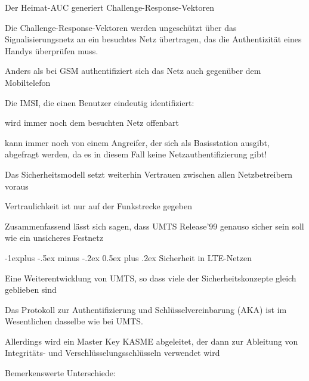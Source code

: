 \documentclass[a4paper]{article}
\makeatletter
\renewcommand{\subsection}{\@startsection{subsection}{2}{0mm}%
 {-1explus -.5ex minus -.2ex}%
 {0.5ex plus .2ex}%
 {\normalfont\normalsize\bfseries}}
\makeatother
\begin{document}
\begin{multicols}{3}
\begin{itemize*}
            \begin{itemize*}
                  \item Der Heimat-AUC generiert Challenge-Response-Vektoren
                  \item Die Challenge-Response-Vektoren werden ungeschützt über das Signalisierungsnetz an ein besuchtes Netz übertragen, das die Authentizität eines Handys überprüfen muss.
                  \item Anders als bei GSM authentifiziert sich das Netz auch gegenüber dem Mobiltelefon
                  \item Die IMSI, die einen Benutzer eindeutig identifiziert:
                  \begin{itemize*} \item wird immer noch dem besuchten Netz offenbart \item kann immer noch von einem Angreifer, der sich als Basisstation ausgibt, abgefragt werden, da es in diesem Fall keine Netzauthentifizierung gibt! \end{itemize*}
                  \item Das Sicherheitsmodell setzt weiterhin Vertrauen zwischen allen Netzbetreibern voraus
                  \item Vertraulichkeit ist nur auf der Funkstrecke gegeben
            \end{itemize*}
            \item
            Zusammenfassend lässt sich sagen, dass UMTS Release'99 genauso sicher
            sein soll wie ein unsicheres Festnetz
      \end{itemize*}


      \subsection{Sicherheit in LTE-Netzen}

      \begin{itemize*}
            \item
            Eine Weiterentwicklung von UMTS, so dass viele der Sicherheitskonzepte
            gleich geblieben sind

            \begin{itemize*}
                  \item Das Protokoll zur Authentifizierung und Schlüsselvereinbarung (AKA) ist im Wesentlichen dasselbe wie bei UMTS.
                  \item Allerdings wird ein Master Key KASME abgeleitet, der dann zur Ableitung von Integritäts- und Verschlüsselungsschlüsseln verwendet wird
            \end{itemize*}
            \item
            Bemerkenswerte Unterschiede:


\end{itemize*}
\end{multicols}
\end{document}
